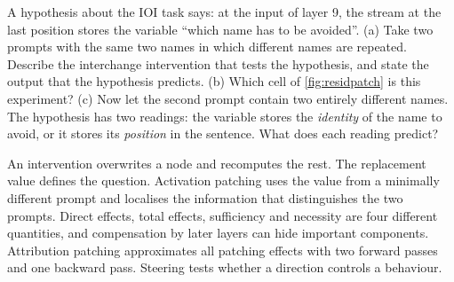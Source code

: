 \begin{exercise}\label{ex:interchange}
A hypothesis about the IOI task says: at the input of layer 9, the stream at the last position stores the
variable ``which name has to be avoided''. (a) Take two prompts with the same two names in which different names
are repeated. Describe the interchange intervention that tests the hypothesis, and state the output that the
hypothesis predicts. (b) Which cell of \cref{fig:residpatch} is this experiment? (c) Now let the second prompt
contain two entirely different names. The hypothesis has two readings: the variable stores the \emph{identity}
of the name to avoid, or it stores its \emph{position} in the sentence. What does each reading predict?
\end{exercise}

\begin{takeaways}
An intervention overwrites a node and recomputes the rest. The replacement value defines the question.
Activation patching uses the value from a minimally different prompt and localises the information that
distinguishes the two prompts. Direct effects, total effects, sufficiency and necessity are four different
quantities, and compensation by later layers can hide important components. Attribution patching approximates
all patching effects with two forward passes and one backward pass. Steering tests whether a direction controls
a behaviour.
\end{takeaways}

